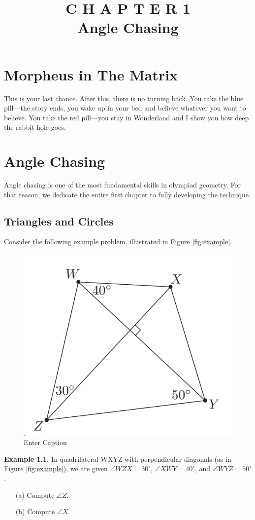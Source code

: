 \documentclass{article}
\begin{document}
\title{C H A P T E R 1\\Angle Chasing}
\maketitle

\section*{Morpheus in The Matrix}
This is your last chance. After this, there is no turning back. You take the blue pill—the story ends, you wake up in your bed and believe whatever you want to believe. You take the red pill—you stay in Wonderland and I show you how deep the rabbit-hole goes.

\section{Angle Chasing}
Angle chasing is one of the most fundamental skills in olympiad geometry. For that reason, we dedicate the entire first chapter to fully developing the technique.

\subsection{Triangles and Circles}
Consider the following example problem, illustrated in Figure \ref{fig:example}.

\begin{figure}
    \centering
    \includegraphics[width=0.5\linewidth]{Image.png}
    \caption{Enter Caption}
    \label{fig:enter-label}
\end{figure}

\textbf{Example 1.1.} In quadrilateral WXYZ with perpendicular diagonals (as in Figure \ref{fig:example}), we are given \( \angle WZX = 30^\circ \), \( \angle XWY = 40^\circ \), and \( \angle WYZ = 50^\circ \).

\begin{enumerate}
    \item[(a)] Compute \( \angle Z \).
    \item[(b)] Compute \( \angle X \).
\end{enumerate}
\end{document}
